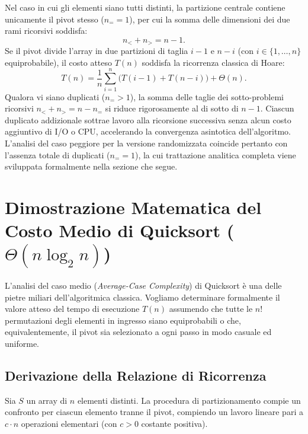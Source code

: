 Nel caso in cui gli elementi siano tutti distinti, la partizione centrale contiene unicamente il pivot stesso ($n_= = 1$), per cui la somma delle dimensioni dei due rami ricorsivi soddisfa:
\begin{equation}
  n_< + n_> = n - 1.
\end{equation}
Se il pivot divide l'array in due partizioni di taglia $i - 1$ e $n - i$ (con $i \in \{1, \dots, n\}$ equiprobabile), il costo atteso $T(n)$ soddisfa la ricorrenza classica di Hoare:
\begin{equation}
  T(n) = \frac{1}{n} \sum_{i=1}^{n} \Big( T(i - 1) + T(n - i) \Big) + \Theta(n).
\end{equation}
Qualora vi siano duplicati ($n_= > 1$), la somma delle taglie dei sotto-problemi ricorsivi $n_< + n_> = n - n_=$ si riduce rigorosamente al di sotto di $n - 1$. Ciascun duplicato addizionale sottrae lavoro alla ricorsione successiva senza alcun costo aggiuntivo di I/O o CPU, accelerando la convergenza asintotica dell'algoritmo. L'analisi del caso peggiore per la versione randomizzata coincide pertanto con l'assenza totale di duplicati ($n_= = 1$), la cui trattazione analitica completa viene sviluppata formalmente nella sezione che segue.

\FloatBarrier
\section{Dimostrazione Matematica del Costo Medio di Quicksort (\texorpdfstring{$\Theta(n \log_2 n)$}{Theta(n log n)})}
\label{sec:quicksort-average-case-proof}

L'analisi del caso medio (\textit{Average-Case Complexity}) di Quicksort è una delle pietre miliari dell'algoritmica classica. Vogliamo determinare formalmente il valore atteso del tempo di esecuzione $T(n)$ assumendo che tutte le $n!$ permutazioni degli elementi in ingresso siano equiprobabili o che, equivalentemente, il pivot sia selezionato a ogni passo in modo casuale ed uniforme.

\subsection{Derivazione della Relazione di Ricorrenza}
\label{subsec:quicksort-recurrence-derivation}

Sia $S$ un array di $n$ elementi distinti. La procedura di partizionamento compie un confronto per ciascun elemento tranne il pivot, compiendo un lavoro lineare pari a $c \cdot n$ operazioni elementari (con $c > 0$ costante positiva).

